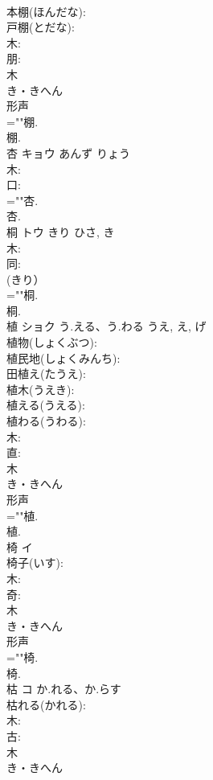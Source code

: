 \documentclass[8pt]{extreport}
\begin{document}
\begin{CJK}{UTF8}{min}
\\	本棚(ほんだな): 
\\	戸棚(とだな): 
\\	木: 
\\	朋: 
\\	木	
\\	き・きへん	
\\	形声 
\\	=""棚.
\\	棚.
\\	杏	キョウ	あんず	りょう	
\\	木: 
\\	口: 
\\	=""杏.
\\	杏.
\\	桐	トウ	きり	ひさ, き	
\\	木: 
\\	同: 
\\	(きり）
\\	=""桐.
\\	桐.
\\	植	ショク	う.える、う.わる	うえ, え, げ	
\\	植物(しょくぶつ): 
\\	植民地(しょくみんち): 
\\	田植え(たうえ): 
\\	植木(うえき): 
\\	植える(うえる): 
\\	植わる(うわる): 
\\	木: 
\\	直: 
\\	木	
\\	き・きへん	
\\	形声 
\\	=""植.
\\	植.
\\	椅	イ			
\\	椅子(いす): 
\\	木: 
\\	奇: 
\\	木	
\\	き・きへん	
\\	形声 
\\	=""椅.
\\	椅.
\\	枯	コ	か.れる、か.らす		
\\	枯れる(かれる): 
\\	木: 
\\	古: 
\\	木	
\\	き・きへん	

\end{CJK}
\end{document}
